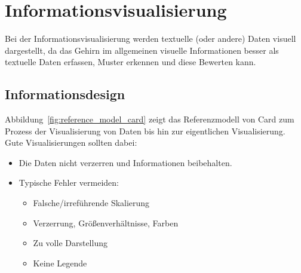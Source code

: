 \documentclass[a4paper, 11pt, accentcolor = tud3b]{tudreport}
\begin{document}
	\chapter{Informationsvisualisierung}
		Bei der Informationsvisualisierung werden textuelle (oder andere) Daten visuell dargestellt, da das Gehirn im allgemeinen visuelle Informationen besser als textuelle Daten erfassen, Muster erkennen und diese Bewerten kann.

		\section{Informationsdesign}
			Abbildung~\ref{fig:reference_model_card} zeigt das Referenzmodell von Card zum Prozess der Visualisierung von Daten bis hin zur eigentlichen Visualisierung. Gute Visualisierungen sollten dabei:
			\begin{itemize}
				\item Die Daten nicht verzerren und Informationen beibehalten.
				\item Typische Fehler vermeiden:
					\begin{itemize}
						\item Falsche/irreführende Skalierung
						\item Verzerrung, Größenverhältnisse, Farben
						\item Zu volle Darstellung
						\item Keine Legende
					\end{itemize}
			\end{itemize}
		
\end{document}
